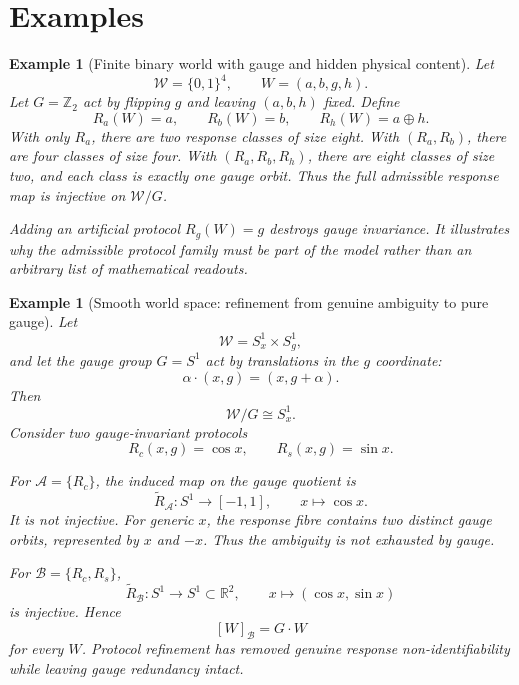 \documentclass[11pt]{article}
\newtheorem{example}[definition]{Example}
\newcommand{\W}{\mathcal W}
\newcommand{\Acal}{\mathcal A}
\newcommand{\Bcal}{\mathcal B}
\begin{document}
\section{Examples}

\begin{example}[Finite binary world with gauge and hidden physical content]
Let
\[
\W=\{0,1\}^4,\qquad W=(a,b,g,h).
\]
Let $G=\mathbb Z_2$ act by flipping $g$ and leaving $(a,b,h)$ fixed.  Define
\[
R_a(W)=a,\qquad
R_b(W)=b,\qquad
R_h(W)=a\oplus h.
\]
With only $R_a$, there are two response classes of size eight.  With
$(R_a,R_b)$, there are four classes of size four.  With
$(R_a,R_b,R_h)$, there are eight classes of size two, and each class is exactly
one gauge orbit.  Thus the full admissible response map is injective on $\W/G$.

Adding an artificial protocol $R_g(W)=g$ destroys gauge invariance.  It
illustrates why the admissible protocol family must be part of the model rather
than an arbitrary list of mathematical readouts.
\end{example}

\begin{example}[Smooth world space: refinement from genuine ambiguity to pure gauge]
Let
\[
\W=S^1_x\times S^1_g,
\]
and let the gauge group $G=S^1$ act by translations in the $g$ coordinate:
\[
\alpha\cdot(x,g)=(x,g+\alpha).
\]
Then
\[
\W/G\cong S^1_x.
\]
Consider two gauge-invariant protocols
\[
R_c(x,g)=\cos x,
\qquad
R_s(x,g)=\sin x.
\]

For $\Acal=\{R_c\}$, the induced map on the gauge quotient is
\[
\widetilde R_{\Acal}:S^1\to[-1,1],
\qquad
x\mapsto\cos x.
\]
It is not injective.  For generic $x$, the response fibre contains two distinct
gauge orbits, represented by $x$ and $-x$.  Thus the ambiguity is not exhausted
by gauge.

For $\Bcal=\{R_c,R_s\}$,
\[
\widetilde R_{\Bcal}:S^1\to S^1\subset\mathbb R^2,
\qquad
x\mapsto(\cos x,\sin x)
\]
is injective.  Hence
\[
[W]_{\Bcal}=G\cdot W
\]
for every $W$.  Protocol refinement has removed genuine response
non-identifiability while leaving gauge redundancy intact.
\end{example}
\end{document}

